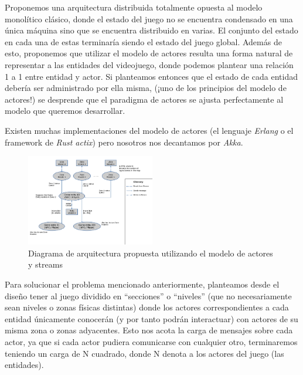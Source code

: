 
\noindent Proponemos una arquitectura distribuida totalmente opuesta al modelo monolítico clásico, 
donde el estado del juego no se encuentra condensado en una única máquina sino que se encuentra 
distribuido en varias. El conjunto del estado en cada una de estas terminaría siendo el 
estado del juego global. Además de esto, proponemos que utilizar el modelo de actores resulta 
una forma natural de representar a las entidades del videojuego, donde podemos plantear una 
relación 1 a 1 entre entidad y actor. Si planteamos entonces que el estado de cada entidad 
debería ser administrado por ella misma, (¡uno de los principios del modelo de actores!) 
se desprende que el paradigma de actores se ajusta perfectamente al modelo que queremos desarrollar.

Existen muchas implementaciones del modelo de actores (el lenguaje \textit{Erlang} o el framework de 
\textit{Rust actix}) pero nosotros nos decantamos por \textit{Akka}.


\begin{figure}[htbp]
    \centering
    \includegraphics[width=0.5\textwidth]{../assets/architecture.png}
    \caption{Diagrama de arquitectura propuesta utilizando el modelo de actores y streams}
\end{figure}

Para solucionar el problema mencionado anteriormente, planteamos desde el diseño tener al juego 
dividido en “secciones” o “niveles” (que no necesariamente sean niveles o zonas físicas distintas) 
donde los actores correspondientes a cada entidad únicamente conocerán (y por tanto podrán interactuar) 
con actores de su misma zona o zonas adyacentes. Esto nos acota la carga de mensajes sobre cada actor, 
ya que si cada actor pudiera comunicarse con cualquier otro, terminaremos teniendo un carga de 
N cuadrado, donde N denota a los actores del juego (las entidades).


